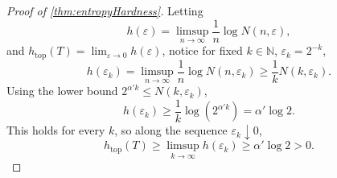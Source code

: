 \documentclass[10pt,a4paper]{amsart}
\DeclareMathOperator{\Top}{top}
\newcommand{\NN}{\mathbb{N}}
\begin{document}
\begin{proof}[Proof of  \cref{thm:entropyHardness}]
Letting
\[
h(\varepsilon)=\limsup_{n\rightarrow \infty}\frac{1}{n} \log N(n,\varepsilon),
\]
and $h_{\Top}(T) = \lim_{\varepsilon\rightarrow 0}h(\varepsilon)$, notice for fixed $k \in \NN$, $\varepsilon_k = 2^{-k}$,
\[
h(\varepsilon_k)=\limsup_{n\rightarrow \infty}\frac{1}{n} \log N(n,\varepsilon_k) \geq \frac{1}{k}  N(k, \varepsilon_k).
\]
Using the lower bound $2^{\alpha' k} \leq N(k, \varepsilon_k)$,
\[
h(\varepsilon_k)\geq \frac{1}{k}\log(2^{\alpha' k}) = \alpha' \log 2.
\]
This holds for every $k$, so along the sequence $\varepsilon_k \downarrow 0$,
\[
h_{\text{top}}(T) \geq \limsup_{k\rightarrow\infty} h(\varepsilon_k)\geq \alpha' \log 2 > 0.
\]
\end{proof}
\end{document}
